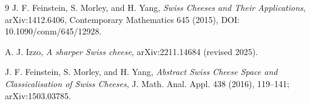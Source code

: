 \documentclass[11pt]{article}
\begin{document}
\begin{thebibliography}{9}
J. F. Feinstein, S. Morley, and H. Yang,
\emph{Swiss Cheeses and Their Applications}, arXiv:1412.6406,
Contemporary Mathematics 645 (2015), DOI: 10.1090/conm/645/12928.

A. J. Izzo,
\emph{A sharper Swiss cheese}, arXiv:2211.14684 (revised 2025).

J. F. Feinstein, S. Morley, and H. Yang,
\emph{Abstract Swiss Cheese Space and Classicalisation of Swiss Cheeses},
J. Math. Anal. Appl. 438 (2016), 119--141; arXiv:1503.03785.
\end{thebibliography}
\end{document}
